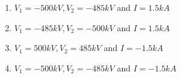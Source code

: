 \documentclass[journal,12pt,onecolumn]{IEEEtran}
\theoremstyle{remark}
\begin{document}
\begin{enumerate}
\begin{figure}[!ht]
\label{fig:my_label}
\end{figure}

\begin{enumerate}
    \item $V_1 = -500kV, V_2 = -485kV$ and $I = 1.5kA$
    \item $V_1 = -485kV, V_2 = -500kV$ and $I = 1.5kA$
    \item $V_1 = 500kV, V_2 = 485kV$ and $I = -1.5kA$
    \item $V_1 = -500kV, V_2 = -485kV$ and $I = -1.5kA$
\end{enumerate}




    

\end{enumerate}
\end{document}
